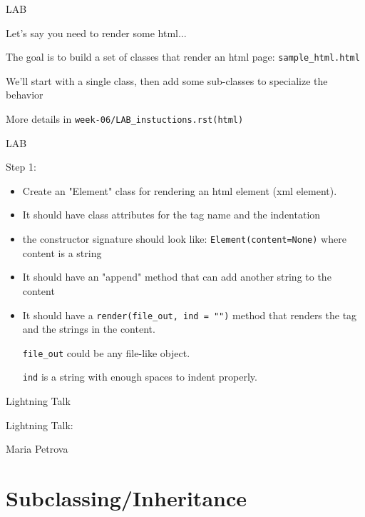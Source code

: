\documentclass{beamer}
\begin{document}
\begin{frame}[fragile]{LAB}

\vfill
{\Large Let's say you need to render some html...}

\vfill
{\Large The goal is to build a set of classes that render an html page:
\verb|sample_html.html|
}

\vfill
{\Large We'll start with a single class, then add some sub-classes to specialize the behavior}

\vfill
More details in \verb|week-06/LAB_instuctions.rst(html)|
\end{frame}

\begin{frame}[fragile]{LAB}

\vfill
{\Large Step 1:}

\begin{itemize}
  \item Create an "Element" class for rendering an html element (xml element). 
  \item It should have class attributes for the tag name  and the
  indentation
  \item the constructor signature should look like:
    \verb|Element(content=None)| where content is a string
  \item It should have an "append" method that can add another string to the content
  \item It should have a \verb|render(file_out, ind = "")| method that renders the tag and the strings in the content.

     \verb|file_out| could be any file-like object.

     \verb|ind| is a string with enough spaces to indent properly.
\end{itemize}

\end{frame}

\begin{frame}{Lightning Talk}

{\centering

\vfill
{\LARGE Lightning Talk:  }

\vfill
{\Large Maria Petrova}

\vfill
}
\end{frame}

\section{Subclassing/Inheritance}
\end{document}
